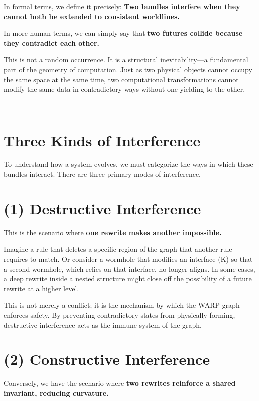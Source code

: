 In formal terms, we define it precisely: \textbf{Two bundles interfere when they cannot both be extended to consistent worldlines.}

In more human terms, we can simply say that \textbf{two futures collide because they contradict each other.}

This is not a random occurrence. It is a structural inevitability—a fundamental part of the geometry of computation. Just as two physical objects cannot occupy the same space at the same time, two computational transformations cannot modify the same data in contradictory ways without one yielding to the other.

---

\section{\texorpdfstring{\textbf{Three Kinds of Interference}}{12.3 --- Three Kinds of Interference}}

To understand how a system evolves, we must categorize the ways in which these bundles interact. There are three primary modes of interference.

\section{\texorpdfstring{\textbf{(1) Destructive Interference}}{12.4 --- (1) Destructive Interference}}

This is the scenario where \textbf{one rewrite makes another impossible.}

Imagine a rule that deletes a specific region of the graph that another rule requires to match. Or consider a wormhole that modifies an interface (K) so that a second wormhole, which relies on that interface, no longer aligns. In some cases, a deep rewrite inside a nested structure might close off the possibility of a future rewrite at a higher level.

This is not merely a conflict; it is the mechanism by which the WARP graph enforces safety. By preventing contradictory states from physically forming, destructive interference acts as the immune system of the graph.

\section{\texorpdfstring{\textbf{(2) Constructive Interference}}{12.5 --- (2) Constructive Interference}}

Conversely, we have the scenario where \textbf{two rewrites reinforce a shared invariant, reducing curvature.}

